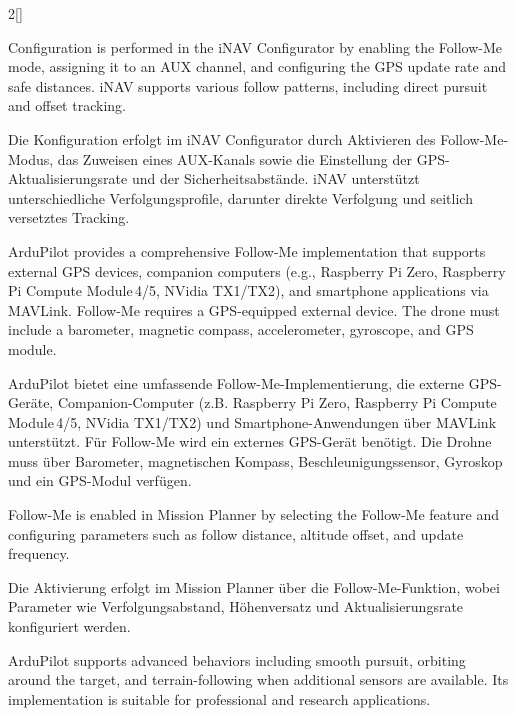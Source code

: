 \begin{paracol}{2}[]
\coleng

Configuration is performed in the iNAV Configurator by enabling the Follow-Me mode, assigning it to an AUX channel, and configuring the GPS update rate and safe distances. iNAV supports various follow patterns, including direct pursuit and offset tracking.

\colger

Die Konfiguration erfolgt im iNAV Configurator durch Aktivieren des Follow-Me-Modus, das Zuweisen eines AUX-Kanals sowie die Einstellung der GPS-Aktualisierungsrate und der Sicherheitsabstände. iNAV unterstützt unterschiedliche Verfolgungsprofile, darunter direkte Verfolgung und seitlich versetztes Tracking.

\colende

\renewcommand{\deutschertitel}{Follow-Me mit ArduPilot}
\renewcommand{\englischertitel}{Follow-Me with ArduPilot}
\makroabschnitt
\label{AbschnittFollowMeArduPilot}

ArduPilot provides a comprehensive Follow-Me implementation that supports external GPS devices, companion computers (e.g., Raspberry Pi Zero, Raspberry Pi Compute Module\,4/5, NVidia TX1/TX2), and smartphone applications via MAVLink. Follow-Me requires a GPS-equipped external device. The drone must include a barometer, magnetic compass, accelerometer, gyroscope, and GPS module. 

\colger

ArduPilot bietet eine umfassende Follow-Me-Implementierung, die externe GPS-Geräte, Companion-Computer (z.B. Raspberry Pi Zero, Raspberry Pi Compute Module\,4/5, NVidia TX1/TX2) und Smartphone-Anwendungen über MAVLink unterstützt. Für Follow-Me wird ein externes GPS-Gerät benötigt. Die Drohne muss über Barometer, magnetischen Kompass, Beschleunigungssensor, Gyroskop und ein GPS-Modul verfügen. 

\coleng

Follow-Me is enabled in Mission Planner by selecting the Follow-Me feature and configuring parameters such as follow distance, altitude offset, and update frequency. 

\colger

Die Aktivierung erfolgt im Mission Planner über die Follow-Me-Funktion, wobei Parameter wie Verfolgungsabstand, Höhenversatz und Aktualisierungsrate konfiguriert werden. 

\coleng

ArduPilot supports advanced behaviors including smooth pursuit, orbiting around the target, and terrain-following when additional sensors are available. Its implementation is suitable for professional and research applications.


\end{paracol}
